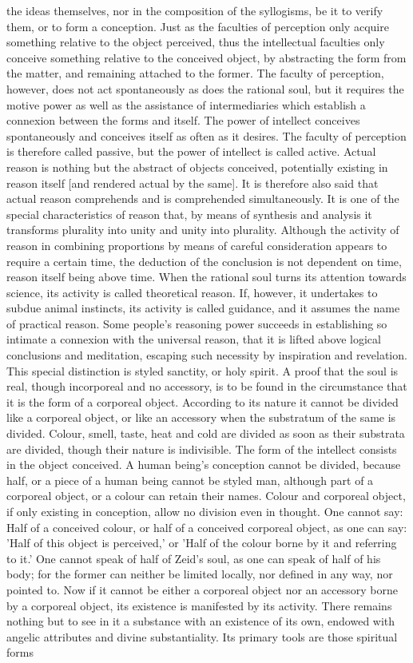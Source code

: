 \documentclass[12pt]{article}
\begin{document}
the ideas themselves, nor in the composition of the syllogisms, be it to verify them, or to form a conception. Just as the faculties of perception only acquire something relative to the object perceived, thus the intellectual faculties only conceive something relative to the conceived object, by abstracting the form from the matter, and remaining attached to the former. The faculty of perception, however, does not act spontaneously as does the rational soul, but it requires the motive power as well as the assistance of intermediaries which establish a connexion between the forms and itself. The power of intellect conceives spontaneously and conceives itself as often as it desires. The faculty of perception is therefore called passive, but the power of intellect is called active. Actual reason is nothing but the abstract of objects conceived, potentially existing in reason itself [and rendered actual by the same]. It is therefore also said that actual reason comprehends and is comprehended simultaneously. It is one of the special characteristics of reason that, by means of synthesis and analysis it transforms plurality into unity and unity into plurality. Although the activity of reason in combining proportions by means of careful consideration appears to require a certain time, the deduction of the conclusion is not dependent on time, reason itself being above time. When the rational soul turns its attention towards science, its activity is called theoretical reason. If, however, it undertakes to subdue animal instincts, its activity is called guidance, and it assumes the name of practical reason. Some people's reasoning power succeeds in establishing so intimate a connexion with the universal reason, that it is lifted above logical conclusions and meditation, escaping such necessity by inspiration and revelation. This special distinction is styled sanctity, or holy spirit. A proof that the soul is real, though incorporeal and no accessory, is to be found in the circumstance that it is the form of a corporeal object. According to its nature it cannot be divided like a corporeal object, or like an accessory when the substratum of the same is divided. Colour, smell, taste, heat and cold are divided as soon as their substrata are divided, though their nature is indivisible. The form of the intellect consists in the object conceived. A human being's conception cannot be divided, because half, or a piece of a human being cannot be styled man, although part of a corporeal object, or a colour can retain their names. Colour and corporeal object, if only existing in conception, allow no division even in thought. One cannot say: Half of a conceived colour, or half of a conceived corporeal object, as one can say: 'Half of this object is perceived,' or 'Half of the colour borne by it and referring to it.' One cannot speak of half of Zeid's soul, as one can speak of half of his body; for the former can neither be limited locally, nor defined in any way, nor pointed to. Now if it cannot be either a corporeal object nor an accessory borne by a corporeal object, its existence is manifested by its activity. There remains nothing but to see in it a substance with an existence of its own, endowed with angelic attributes and divine substantiality. Its primary tools are those spiritual forms 
\end{document}
